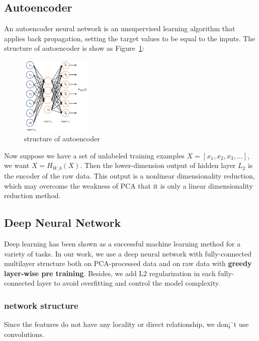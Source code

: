 \documentclass[sigconf]{acmart}
\begin{document}
\subsection{Autoencoder}
An autoencoder neural network \cite{ng2011sparse} is an unsupervised learning algorithm that applies back propagation, setting the target values to be equal to the inputs. The structure of autoencoder is show as Figure~\ref{auto_1}:
\begin{figure}[!ht]
	\centering
	\includegraphics[width=0.3\textwidth]{../figs/auto_1.png}
	\caption{structure of autoencoder}
	\label{auto_1}
	\centering
\end{figure}

Now suppose we have  a set of unlabeled training examples $X=[x_1,x_2,x_3,\dots]$, we want $X=H_{W,b}(X)$. Then the lower-dimension output of hidden layer $L_2$ is the encoder of the raw data. This output is a nonlinear dimensionality reduction, which may overcome the weakness of PCA that it is only a linear dimensionality reduction method.


\subsection{Deep Neural Network}
Deep learning \cite{Deeplearning} has been shown as a successful machine learning method for a variety of tasks. In our work, we use a deep neural network with fully-connected multilayer structure both on PCA-processed data and on raw data with \textbf{greedy layer-wise pre training}. Besides, we add L2 regularization in each fully-connected layer to avoid overfitting and control the model complexity.
\subsubsection{network structure} Since the features do not have any locality or direct relationship, we don¡¯t use convolutions.\\
\end{document}
